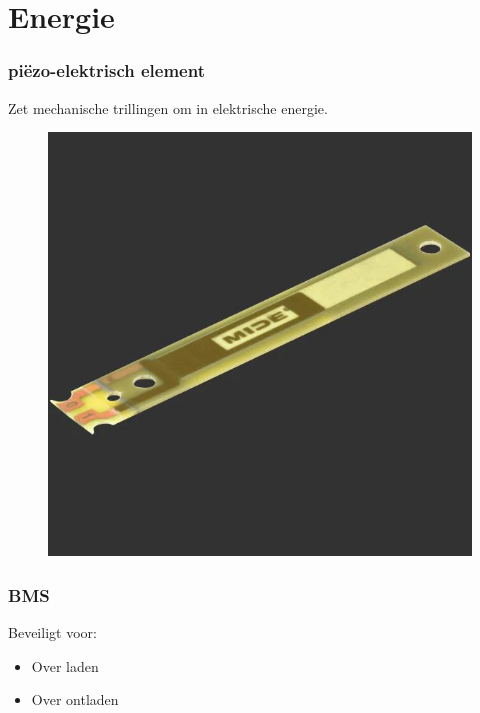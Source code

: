 \section{Energie}
    \begin{frame}
        \frametitle{piëzo-elektrisch element}
    
        Zet mechanische trillingen om in elektrische energie.
        \begin{figure}[ht]
            \centering
            \includegraphics[scale=0.2]{img/peizo.png}
        \end{figure}


    \end{frame}
    \begin{frame}
        \frametitle{BMS}
    
        Beveiligt voor:
        \begin{itemize}
            \item Over laden
            \item Over ontladen
        \end{itemize}
    
    \end{frame}
    
        
    
